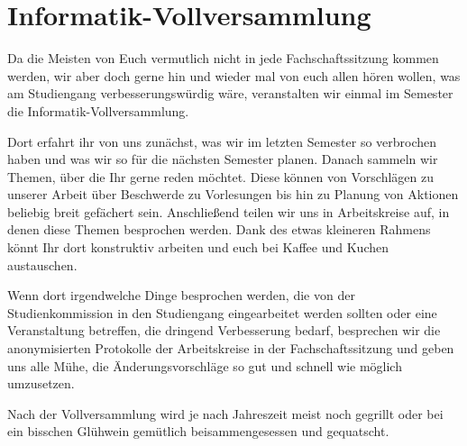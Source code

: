 \section{Informatik-Vollversammlung}

Da die Meisten von Euch vermutlich nicht in jede Fachschaftssitzung kommen werden, wir aber doch gerne hin und wieder mal von euch allen hören wollen, was am Studiengang verbesserungswürdig wäre, veranstalten wir einmal im Semester die Informatik-Vollversammlung.

Dort erfahrt ihr von uns zunächst, was wir im letzten Semester so verbrochen haben und was wir so für die nächsten Semester planen. Danach sammeln wir Themen, über die Ihr gerne reden möchtet. Diese können von Vorschlägen zu unserer Arbeit über Beschwerde zu Vorlesungen bis hin zu Planung von Aktionen beliebig breit gefächert sein. Anschließend teilen wir uns in Arbeitskreise auf, in denen diese Themen besprochen werden. Dank des etwas kleineren Rahmens könnt Ihr dort konstruktiv arbeiten und euch bei Kaffee und Kuchen austauschen.


Wenn dort irgendwelche Dinge besprochen werden, die von der Studienkommission in den Studiengang eingearbeitet werden sollten oder eine Veranstaltung betreffen, die dringend Verbesserung bedarf, besprechen wir die anonymisierten Protokolle der Arbeitskreise in der Fachschaftssitzung und geben uns alle Mühe, die Änderungsvorschläge so gut und schnell wie möglich umzusetzen.

Nach der Vollversammlung wird je nach Jahreszeit meist noch gegrillt oder bei ein bisschen Glühwein gemütlich beisammengesessen und gequatscht.
